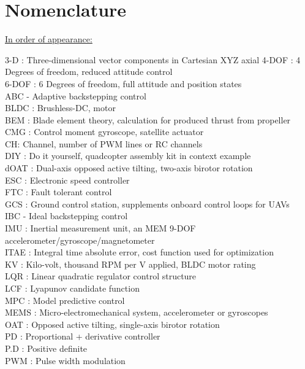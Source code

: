 \documentclass[a4paper, 11pt, oneside, openright, parskip=full]{book}
\begin{document}
\chapter{Nomenclature}
\label{ch:nom}
\underline{In order of appearance:}
\par
3-D : Three-dimensional vector components in Cartesian XYZ axial
4-DOF : 4 Degrees of freedom, reduced attitude control\\
6-DOF : 6 Degrees of freedom, full attitude and position states\\
ABC - Adaptive backstepping control\\
BLDC : Brushless-DC, motor\\
BEM : Blade element theory, calculation for produced thrust from propeller\\
CMG : Control moment gyroscope, satellite actuator\\
CH: Channel, number of PWM lines or RC channels \\
DIY : Do it yourself, quadcopter assembly kit in context example\\
dOAT : Dual-axis opposed active tilting, two-axis birotor rotation\\
ESC : Electronic speed controller\\
FTC : Fault tolerant control\\
GCS : Ground control station, supplements onboard control loops for UAVs\\
IBC - Ideal backstepping control\\
IMU : Inertial measurement unit, an MEM 9-DOF accelerometer/gyroscope/magnetometer\\
ITAE : Integral time absolute error, cost function used for optimization\\
KV : Kilo-volt, thousand RPM per V applied, BLDC motor rating\\
LQR : Linear quadratic regulator control structure\\
LCF : Lyapunov candidate function\\
MPC : Model predictive control\\
MEMS : Micro-electromechanical system, accelerometer or gyroscopes\\
OAT : Opposed active tilting, single-axis birotor rotation\\
PD : Proportional + derivative controller\\
P.D : Positive definite\\
PWM : Pulse width modulation\\
\end{document}
